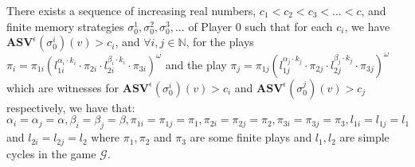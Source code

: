 \begin{proposition}
    \label{PropConvergenceStrategies}
    There exists a sequence of increasing real numbers, $c_1 < c_2 < c_3 < \dotsc < c$, and finite memory strategies $\sigma_0^1, \sigma_0^2, \sigma_0^3, \dotsc$ of Player 0 such that for each $c_i$, we have $\mathbf{ASV}^{\epsilon} (\sigma_0^i)(v) > c_i$, and  $\forall i, j \in \mathbb{N}$, for the plays $\pi_i= \pi_{1i}(l^{\alpha_i \cdot k_i}_{1i} \cdot \pi_{2i} \cdot l^{\beta_i \cdot k_i}_{2i} \cdot \pi_{3i})^{\omega}$ and the play $\pi_j= \pi_{1j}(l^{\alpha_j \cdot k_j}_{1j} \cdot \pi_{2j} \cdot l^{\beta_j \cdot k_j}_{2j} \cdot \pi_{3j})^{\omega}$ which are witnesses for $ \mathbf{ASV}^{\epsilon}(\sigma_0^i)(v) > c_i$ and $ \mathbf{ASV}^{\epsilon}(\sigma_0^j)(v) > c_j$ respectively, we have that:
    $\alpha_i = \alpha_j = \alpha, \beta_i = \beta_j = \beta, \pi_{1i} = \pi_{1j} = \pi_1, \pi_{2i} = \pi_{2j} = \pi_2, \pi_{3i} = \pi_{3j} = \pi_3, l_{1i} = l_{1j} = l_1$ and $l_{2i} = l_{2j} = l_2$ where $\pi_1, \pi_2$ and $\pi_3$ are some finite plays and $l_1, l_2$ are simple cycles in the game $\mathcal{G}$.
\end{proposition}
